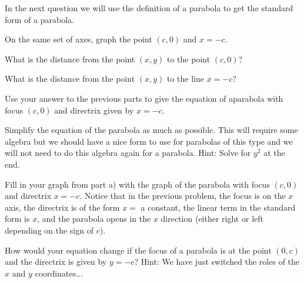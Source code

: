 In the next question we will use the definition of a parabola to get the standard form of a parabola.

\begin{annotation}
\end{annotation}

\bq\label{q22} \be
\item On the same set of axes, graph the point $(c,0)$ and $x=-c$.
\item What is the distance from the point $(x,y)$ to the point $(c,0)$?
\item What is the distance from the point $(x,y)$ to the line $x=-c$?
\item Use your answer to the previous parts to give the equation of a\break parabola with focus $(c,0)$ and directrix given by $x= -c$.
\item Simplify the equation of the parabola as much as possible. This will require some algebra but we should have a nice form to use for parabolas of this type and we will not need to do this algebra again for a parabola. Hint: Solve for $y^2$ at the end.
\item Fill in your graph from part a) with the graph of the parabola with focus $(c,0)$ and directrix $x= -c$.
\ee \eq
Notice that in the previous problem, the focus is on the $x$ axis, the directrix is of the form $x=$ a constant, the linear term in the standard form is $x$, and the parabola opens in the $x$ direction (either right or left depending on the sign of $c$).

\question\label{q23} How would your equation change if the focus of a parabola is at the point $(0,c)$ and the directrix is given by $y=-c$? Hint: We have just switched the roles of the $x$ and $y$ coordinates...


